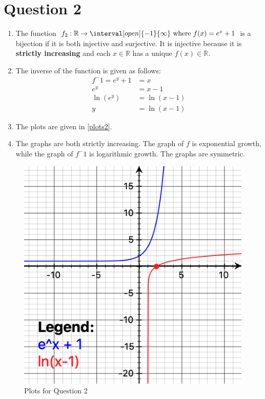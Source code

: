 \section*{Question 2}
\begin{enumerate}
  \item The function \( f_2: \mathbb{R} \rightarrow \interval[open]{-1}{\infty} \text{ where } f(x) = e^x + 1 \) is a bijection if it is both injective and surjective. It is injective because it is \textbf{strictly increasing} and each \( x \in \mathbb{R} \) has a unique \( f(x) \in \mathbb{R} \).
  \item  The inverse of the function is given as follows: \begin{align}
    f^-1 = e^y + 1 &= x \\
    e^y &= x-1 \\
    \ln(e^y) &= \ln(x-1) \\
    y &= \ln(x-1)
  \end{align}

  \item The plots are given in \autoref{plots2}.
  \item The graphs are both strictly increasing. The graph of \( f \) is exponential growth, while the graph of \( f^-1 \) is logarithmic growth. The graphs are symmetric.
\end{enumerate} 

\begin{figure}[h]
  \centering
  \caption{Plots for Question 2}\label{plots2}
  \includegraphics[]{expplot.png}
\end{figure}



